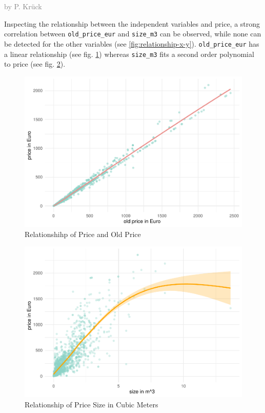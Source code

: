 \documentclass[a4paper, nobind]{templates/ociamthesis}
\begin{document}
\textcolor{gray}{by P. Krück}

Inspecting the relationship between the independent variables and price, a strong correlation between \texttt{old\_price\_eur} and \texttt{size\_m3} can be observed, while none can be detected for the other variables (see \ref{fig:relationship-x-y}).
\texttt{old\_price\_eur} has a linear relationship (see fig. \ref{fig:relationship-old-price}) whereas \texttt{size\_m3} fits a second order polynomial to price (see fig. \ref{fig:relationship-size-m3}).

\begin{figure}
\includegraphics[width=1\linewidth]{_main_files/figure-latex/relationship-old-price-1} \caption{Relationshihp of Price and Old Price}\label{fig:relationship-old-price}
\end{figure}

\begin{figure}
\includegraphics[width=1\linewidth]{_main_files/figure-latex/relationship-size-m3-1} \caption{Relationship of Price Size in Cubic Meters}\label{fig:relationship-size-m3}
\end{figure}
\end{document}
